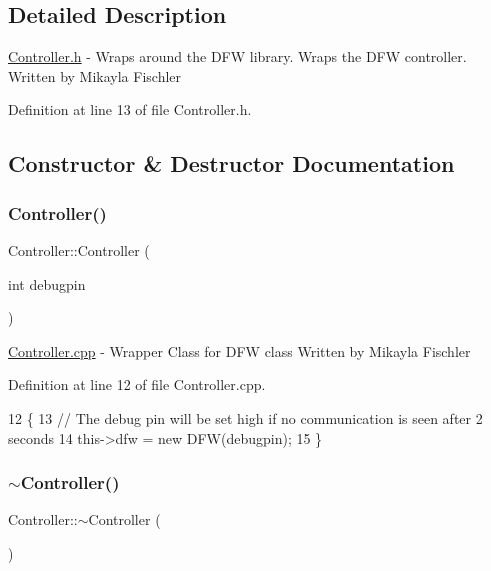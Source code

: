 \subsection{Detailed Description}
\hyperlink{_controller_8h}{Controller.\+h} -\/ Wraps around the D\+FW library. Wraps the D\+FW controller. Written by Mikayla Fischler 

Definition at line 13 of file Controller.\+h.



\subsection{Constructor \& Destructor Documentation}
\mbox{\label{class_controller_aab64b54728b3f5d68bd2320605bdc51d}} 
\subsubsection{\texorpdfstring{Controller()}{Controller()}}
{\footnotesize\ttfamily Controller\+::\+Controller (\begin{DoxyParamCaption}\item[{int}]{debugpin }\end{DoxyParamCaption})}

\hyperlink{_controller_8cpp}{Controller.\+cpp} -\/ Wrapper Class for D\+FW class Written by Mikayla Fischler 

Definition at line 12 of file Controller.\+cpp.


\begin{DoxyCode}
12                                    \{
13     \textcolor{comment}{// The debug pin will be set high if no communication is seen after 2 seconds}
14     this->dfw = \textcolor{keyword}{new} DFW(debugpin);
15 \}
\end{DoxyCode}
\mbox{\label{class_controller_a0ab87934c4f7a266cfdb86e0f36bc1b5}} 
\subsubsection{\texorpdfstring{$\sim$\+Controller()}{~Controller()}}
{\footnotesize\ttfamily Controller\+::$\sim$\+Controller (\begin{DoxyParamCaption}{ }\end{DoxyParamCaption})}



